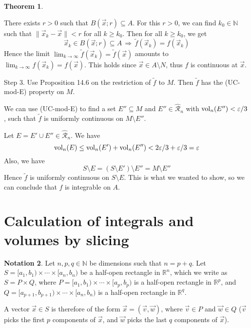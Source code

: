\documentclass[11pt]{article}
\theoremstyle{definition}
\newtheorem{thm}{Theorem}[section]
\newtheorem{notation}[thm]{Notation}
\newcommand{\N}{\ensuremath{\mathbb{N}}}
\newcommand{\R}{\ensuremath{\mathbb{R}}}
\begin{document}
\begin{thm}
\begin{enumerate}[label={}]
There exists $r > 0$ such that $B(\vec{x}; r) \subseteq A$. For this $r > 0$, we can find $k_0 \in \N$ such that $\|\vec{x}_k - \vec{x}\| < r$ for all $k \geq k_0$. Then for all $k \geq k_0$, we get
$$\vec{x}_k \in B(\vec{x}; r) \subseteq A \,\Rightarrow\, \tilde{f}(\vec{x}_k) = f(\vec{x}_k)$$
Hence the limit $\lim_{k\to\infty} \tilde{f}(\vec{x}_k) = \tilde{f}(\vec{x})$ amounts to $\lim_{k\to\infty} f(\vec{x}_k) = f(\vec{x})$. This holds since $\vec{x} \in A \setminus N$, thus $f$ is continuous at $\vec{x}$.
\end{enumerate}
\newpage
{\sc Step 3.} Use Proposition 14.6 on the restriction of $\tilde{f}$ to $M$. Then $\tilde{f}$ has the (UC-mod-E) property on $M$.

We can use (UC-mod-E) to find a set $E'' \subseteq M$ and $E'' \in \widehat{\mathcal{R}}_n$ with ${\rm vol}_n(E'') < \varepsilon / 3$, such that $\tilde{f}$ is uniformly continuous on $M \setminus E''$. 

Let $E = E' \cup E'' \in \widehat{\mathcal{R}}_n$. We have
$${\rm vol}_n(E) \leq {\rm vol}_n(E') + {\rm vol}_n(E'') < 2\varepsilon / 3 + \varepsilon / 3 = \varepsilon$$
Also, we have
$$S \setminus E = (S \setminus E') \setminus E'' = M \setminus E''$$
Hence $\tilde{f}$ is uniformly continuous on $S \setminus E$. This is what we wanted to show, so we can conclude that $f$ is integrable on $A$. \hfill \qedsymbol
\end{thm}

\newpage
{}
\section{Calculation of integrals and volumes by slicing}

\begin{notation}
Let $n, p, q \in \N$ be dimensions such that $n = p + q$. Let $S = [a_1, b_1) \times \cdots \times [a_n, b_n)$ be a half-open rectangle in $\R^n$, which we write as $S = P \times Q$, where $P = [a_1, b_1) \times \cdots \times [a_p, b_p)$ is a half-open rectangle in $\R^p$, and $Q = [a_{p+1}, b_{p+1}) \times \cdots \times [a_n, b_n)$ is a half-open rectangle in $\R^q$.

A vector $\vec{x} \in S$ is therefore of the form $\vec{x} = (\vec{v}, \vec{w})$, where $\vec{v} \in P$ and $\vec{w} \in Q$ ($\vec{v}$ picks the first $p$ components of $\vec{x}$, and $\vec{w}$ picks the last $q$ components of $\vec{x}$).
\end{notation}
\end{document}
